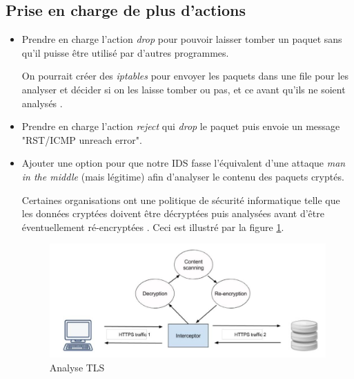 \documentclass[a4paper]{article}
\begin{document}
\subsection{Prise en charge de plus d'actions}



\begin{itemize}
    \item Prendre en charge l'action \textit{drop} pour pouvoir laisser tomber un paquet sans qu'il puisse être utilisé par d'autres programmes.
    \begin{example}
        On pourrait créer des \textit{iptables} pour envoyer les paquets dans une file pour les analyser et décider si on les laisse tomber ou pas, et ce avant qu'ils ne soient analysés \cite{12}.
    \end{example}
    \item Prendre en charge l'action \textit{reject} qui \textit{drop} le paquet puis envoie un message "RST/ICMP unreach error".
    \item Ajouter une option pour que notre IDS fasse l'équivalent d'une attaque \textit{man in the middle} (mais légitime) afin d'analyser le contenu des paquets cryptés.
    \begin{example}
        Certaines organisations ont une politique de sécurité informatique telle que les données cryptées doivent être décryptées puis analysées avant d'être éventuellement ré-encryptées \cite{13}. Ceci est illustré par la figure \ref{fig:tlsanalysis}.
        \begin{figure}[H]
            \centering
            \includegraphics[width=0.99\linewidth]{images/tls-analysis.jpg}
            \caption{Analyse TLS \cite{13}}
            \label{fig:tlsanalysis}
        \end{figure}
    \end{example}
\end{itemize}
\end{document}

